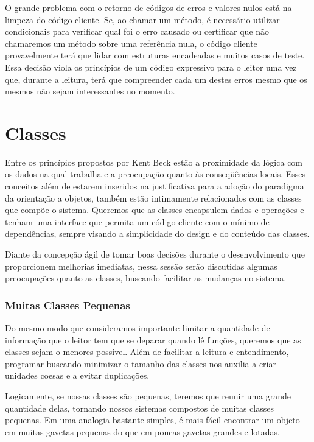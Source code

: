O grande problema com o retorno de códigos de erros e valores nulos está na limpeza do código cliente. Se, ao chamar um método, é necessário utilizar condicionais para verificar qual foi o erro causado ou certificar que não chamaremos um método sobre uma referência nula, o código cliente provavelmente terá que lidar com estruturas encadeadas e muitos casos de teste. Essa decisão viola os princípios de um código expressivo para o leitor uma vez que, durante a leitura, terá que compreender cada um destes erros mesmo que os mesmos não sejam interessantes no momento.

\section{Classes}
\label{sec:classes}

Entre os princípios propostos por Kent Beck estão a proximidade da lógica com os dados na qual trabalha e a preocupação quanto às conseqüências locais. Esses conceitos além de estarem inseridos na justificativa para a adoção do paradigma da orientação a objetos, também estão intimamente relacionados com as classes que compõe o sistema. Queremos que as classes encapsulem dados e operações e tenham uma interface que permita um código cliente com o mínimo de dependências, sempre visando a simplicidade do design e do conteúdo das classes.
	
Diante da concepção ágil de tomar boas decisões durante o desenvolvimento que proporcionem melhorias imediatas, nessa sessão serão discutidas algumas preocupações quanto as classes, buscando facilitar as mudanças no sistema.

\subsubsection{Muitas Classes Pequenas}
Do mesmo modo que consideramos importante limitar a quantidade de informação que o leitor tem que se deparar quando lê funções, queremos que as classes sejam o menores possível. Além de facilitar a leitura e entendimento, programar buscando minimizar o tamanho das classes nos auxilia a criar unidades coesas e a evitar duplicações. 
	
Logicamente, se nossas classes são pequenas, teremos que reunir uma grande quantidade delas, tornando nossos sistemas compostos de muitas classes pequenas. Em uma analogia bastante simples, é mais fácil encontrar um objeto em muitas gavetas pequenas do que em poucas gavetas grandes e lotadas.

